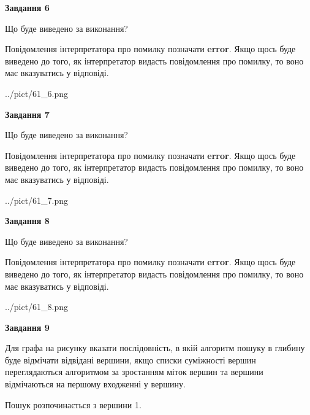 \documentclass[12pt, ukrainian]{article}
\begin{document}
{\begin {large}
{\begin {center}\textbf{Завдання 6}\end {center}}\par
Що буде виведено за виконання?

Повідомлення інтерпретатора про помилку позначати \textbf{error}.
Якщо щось буде виведено до того, як інтерпретатор видасть повідомлення про помилку, 
то воно має вказуватись у відповіді. \par


\begin{center}
	{../pict/61_6.png}
\end{center}
\newpage

{\begin {center}\textbf{Завдання 7}\end {center}}\par
Що буде виведено за виконання?

Повідомлення інтерпретатора про помилку позначати \textbf{error}.
Якщо щось буде виведено до того, як інтерпретатор видасть повідомлення про помилку, 
то воно має вказуватись у відповіді. \par


\begin{center}
	{../pict/61_7.png}
\end{center}
\newpage

{\begin {center}\textbf{Завдання 8}\end {center}}\par
Що буде виведено за виконання?

Повідомлення інтерпретатора про помилку позначати \textbf{error}.
Якщо щось буде виведено до того, як інтерпретатор видасть повідомлення про помилку, 
то воно має вказуватись у відповіді. \par


\begin{center}
	{../pict/61_8.png}
\end{center}
\newpage

{\begin {center}\textbf{Завдання 9}\end {center}}\par
Для графа на рисунку вказати послідовність, в якій алгоритм пошуку в глибину буде відмічати відвідані вершини, якщо списки суміжності вершин переглядаються алгоритмом за зростанням міток вершин та вершини відмічаються на першому вход\-женні у вершину.\par
Пошук розпочинається з вершини 1.\par


\end{large}}
\end{document}
